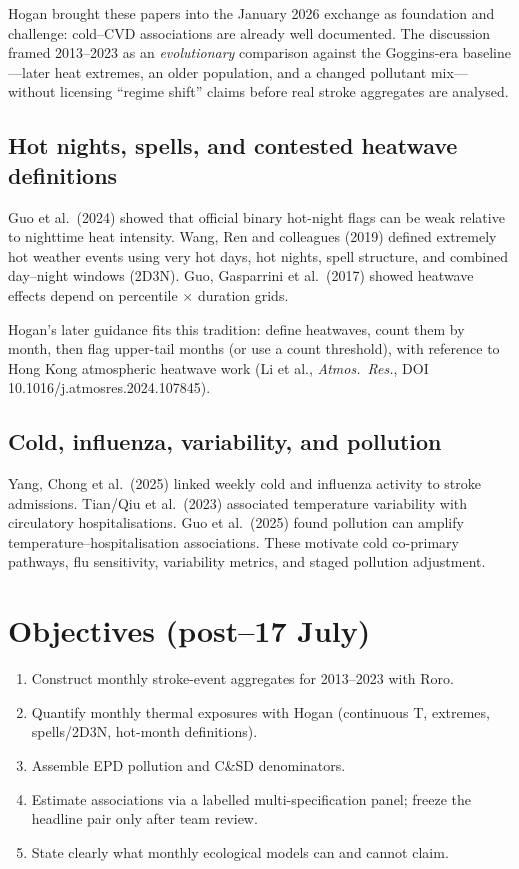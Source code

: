 \documentclass[11pt,a4paper]{article}
\begin{document}
Hogan brought these papers into the January 2026 exchange as foundation and challenge: cold--CVD associations are already well documented. The discussion framed 2013--2023 as an \emph{evolutionary} comparison against the Goggins-era baseline---later heat extremes, an older population, and a changed pollutant mix---without licensing ``regime shift'' claims before real stroke aggregates are analysed.

\subsection{Hot nights, spells, and contested heatwave definitions}
Guo et al.\ (2024) showed that official binary hot-night flags can be weak relative to nighttime heat intensity. Wang, Ren and colleagues (2019) defined extremely hot weather events using very hot days, hot nights, spell structure, and combined day--night windows (2D3N). Guo, Gasparrini et al.\ (2017) showed heatwave effects depend on percentile $\times$ duration grids.

Hogan's later guidance fits this tradition: define heatwaves, count them by month, then flag upper-tail months (or use a count threshold), with reference to Hong Kong atmospheric heatwave work (Li et al., \emph{Atmos.\ Res.}, DOI 10.1016/j.atmosres.2024.107845).

\subsection{Cold, influenza, variability, and pollution}
Yang, Chong et al.\ (2025) linked weekly cold and influenza activity to stroke admissions. Tian/Qiu et al.\ (2023) associated temperature variability with circulatory hospitalisations. Guo et al.\ (2025) found pollution can amplify temperature--hospitalisation associations. These motivate cold co-primary pathways, flu sensitivity, variability metrics, and staged pollution adjustment.

\section{Objectives (post--17 July)}
\begin{enumerate}
  \item Construct monthly stroke-event aggregates for 2013--2023 with Roro.
  \item Quantify monthly thermal exposures with Hogan (continuous T, extremes, spells/2D3N, hot-month definitions).
  \item Assemble EPD pollution and C\&SD denominators.
  \item Estimate associations via a labelled multi-specification panel; freeze the headline pair only after team review.
  \item State clearly what monthly ecological models can and cannot claim.
\end{enumerate}
\end{document}
